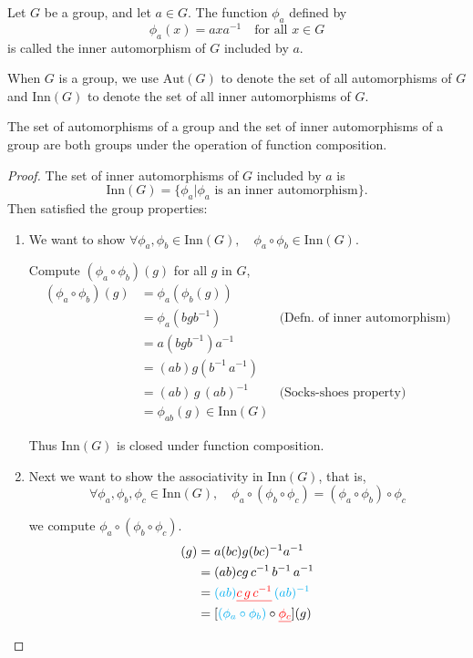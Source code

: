 \begin{definition}
    Let $G$ be a group, and let $a \in G$. The function $\phi_a$ defined by 
    \[
        \phi_a(x) = axa^{-1} \quad \text{for all } x \in G
    \]
    is called the inner automorphism of $G$ included by $a$.

    When $G$ is a group, we use $\text{Aut}(G)$ to denote the set of all automorphisms of $G$ and 
    $\text{Inn}(G)$ to denote the set of all inner automorphisms of $G$.
\end{definition}

\begin{theorem}
    The set of automorphisms of a group and the set of inner automorphisms of a group are both groups under the 
    operation of function composition.
\end{theorem}
\begin{proof}
    The set of inner automorphisms of $G$ included by $a$ is 
    \[
        \text{Inn}(G) = \{ \phi_a | \phi_a \text{ is an inner automorphism}  \}.
    \]
    Then satisfied the group properties:
    \begin{enumerate}
        \item We want to show $\forall \phi_a, \phi_b \in \text{Inn}(G), \quad \phi_a \circ \phi_b \in \text{Inn}(G)$.  

        Compute $(\phi_a \circ \phi_b)(g)$ for all $g$ in $G$,
        \begin{align*}
            (\phi_a \circ \phi_b)(g) &= \phi_a (\phi_b (g))\\
            &= \phi_a(bgb^{-1}) & \text{(Defn. of inner automorphism)}\\
            &= a(bgb^{-1})a^{-1}\\
            &= (ab)g(b^{-1}\, a^{-1})\\
            &= (ab)\, g\, (ab)^{-1} & \text{(Socks-shoes property)}\\
            &= \phi_{ab}(g) \in \text{Inn}(G)
        \end{align*}
        
        Thus $\text{Inn}(G)$ is closed under function composition.

        \item Next we want to show the associativity in $\text{Inn}(G)$, that is, 
        \[
            \forall \phi_a, \phi_b, \phi_c \in \text{Inn}(G), \quad \phi_a \circ (\phi_b \circ \phi_c) = (\phi_a \circ \phi_b) \circ \phi_c 
        \]

        we compute $\phi_a \circ (\phi_b \circ \phi_c)$.
        \begin{align*}
            [\phi_a \circ (\phi_b \circ \phi_c)](g) &= a(bc)g(bc)^{-1}a^{-1}\\
            &= (ab)c g \, c^{-1}\, b^{-1}\, a^{-1}\\
            &= {\color{cyan} (ab)}{\color{red} \underline{c\, g\, c^{-1}}}\, {\color{cyan} (ab)^{-1}}\\
            &= [{\color{cyan} (\phi_a \circ \phi_b)} \circ {\color{red} \underline{\phi_c}}](g)
        \end{align*}


\end{enumerate}
\end{proof}
